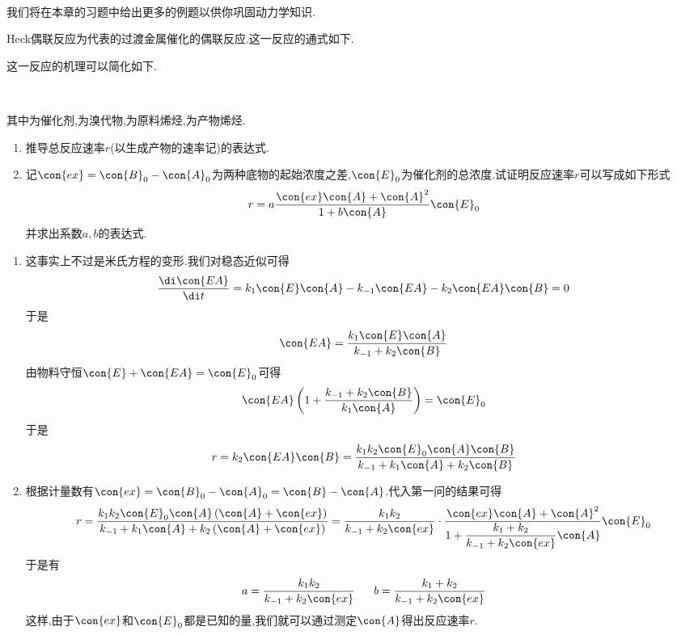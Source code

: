 \documentclass{ctexart}
\begin{document}
\pagestyle{plain}
\noindent{}\vspace{15pt}\\
\indent 我们将在本章的习题中给出更多的例题以供你巩固动力学知识.
\setcounter{Pcounter}{0}
\begin{problem}
    Heck偶联反应为代表的过渡金属催化的偶联反应.这一反应的通式如下.
    \begin{tightcenter}
    \end{tightcenter}
    这一反应的机理可以简化如下.
    \begin{tightcenter}
         \\
    \end{tightcenter}
    其中为催化剂,为溴代物,为原料烯烃,为产物烯烃.
    \begin{enumerate}[label=\tbf{\arabic{Pcounter}-\arabic*},topsep=0pt,parsep=0pt,itemsep=0pt,partopsep=0pt]
        \item 推导总反应速率$r$(以生成产物的速率记)的表达式.
        \item 记$\con{ex}=\con{B}_0-\con{A}_0$为两种底物的起始浓度之差,$\con{E}_0$为催化剂的总浓度.试证明反应速率$r$可以写成如下形式
            \[r=a\dfrac{\con{ex}\con{A}+\con{A}^2}{1+b\con{A}}\con{E}_0\]
            并求出系数$a,b$的表达式.
    \end{enumerate}
\end{problem}
\begin{solution}
    \begin{enumerate}[label=\tbf{\arabic{Pcounter}-\arabic*},topsep=0pt,parsep=0pt,itemsep=0pt,partopsep=0pt]
        \item 这事实上不过是米氏方程的变形.我们对稳态近似可得
            \[\dfrac{\di\con{EA}}{\di t}=k_1\con{E}\con{A}-k_{-1}\con{EA}-k_2\con{EA}\con{B}=0\]
            于是
            \[\con{EA}=\dfrac{k_1\con{E}\con{A}}{k_{-1}+k_2\con{B}}\]
            由物料守恒$\con{E}+\con{EA}=\con{E}_0$可得
            \[\con{EA}\left(1+\dfrac{k_{-1}+k_2\con{B}}{k_1\con{A}}\right)=\con{E}_0\]
            于是
            \[r=k_2\con{EA}\con{B}=\dfrac{k_1k_2\con{E}_0\con{A}\con{B}}{k_{-1}+k_1\con{A}+k_2\con{B}}\]
        \item 根据计量数有$\con{ex}=\con{B}_0-\con{A}_0=\con{B}-\con{A}$.代入第一问的结果可得
            \[r=\dfrac{k_1k_2\con{E}_0\con{A}\left(\con{A}+\con{ex}\right)}{k_{-1}+k_1\con{A}+k_2\left(\con{A}+\con{ex}\right)}
            =\dfrac{k_1k_2}{k_{-1}+k_2\con{ex}}\cdot\dfrac{\con{ex}\con{A}+\con{A}^2}{1+\dfrac{k_1+k_2}{k_{-1}+k_2\con{ex}}\con{A}}\con{E}_0\]
            于是有
            \[a=\dfrac{k_1k_2}{k_{-1}+k_2\con{ex}}\ \ \ \ \ b=\dfrac{k_1+k_2}{k_{-1}+k_2\con{ex}}\]
            这样,由于$\con{ex}$和$\con{E}_0$都是已知的量,我们就可以通过测定$\con{A}$得出反应速率$r$.
    \end{enumerate}
\end{solution}
\end{document}
